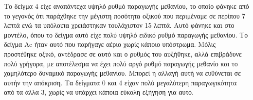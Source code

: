 \documentclass[11pt]{article}
\begin{document}
Το δείγμα 4 είχε αναπάντεχα υψηλό ρυθμό παραγωγής μεθανίου, το οποίο φάνηκε από το γεγονός ότι παράχθηκε την μέγιστη ποσότητα οξικού που περιμέναμε σε περίπου 7 λεπτά ενώ τα υπόλοιπα χρειάστηκαν τουλάχιστον 15 λεπτά. Αυτό φάνηκε και στο μοντέλο, όπου το δείγμα αυτό είχε πολύ υψηλό ειδικό ρυθμό παραγωγής μεθανίου. Το δείγμα Ac ήταν αυτό που παρήγαγε αέριο χωρίς κάποιο υπόστρωμα. Μόλις προστέθηκε οξικό, αντέδρασε σε αυτό και ο ρυθμός του αυξήθηκε, αλλά επιβράδυνε πολύ γρήγορα, με αποτέλεσμα να έχει πολύ αργό ρυθμό παραγωγής μεθανίο και το χαμηλότερο δυναμικό παραγωγής μεθανίου. Μπορεί η αλλαγή αυτή να ευθύνεται σε αυτήν την απόκριση. Τα δείγματα 0 και 4 είχαν πολύ μεγαλύτερη παραγωγικότητα από τα άλλα 3, χωρίς να υπάρχει κάποια εύκολη εξήγηση για αυτό.
\end{document}
